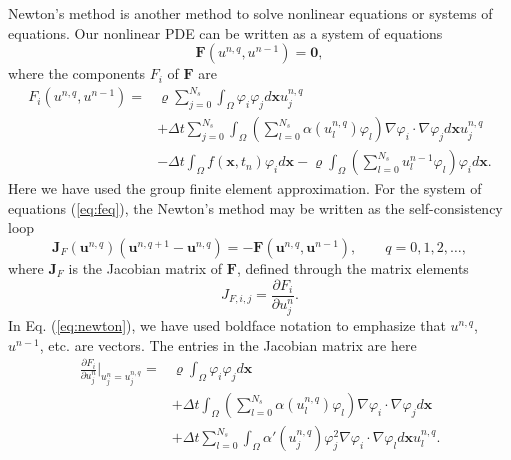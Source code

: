 \documentclass[twoside]{article}
\begin{document}
Newton's method is another method to solve nonlinear equations or systems of equations. Our nonlinear PDE can be written as a system of equations
\begin{equation} \label{eq:feq}
  \mathbf{F}(u^{n, q}, u^{n-1}) = \mathbf{0},
\end{equation}
where the components $F_{i}$ of $\mathbf{F}$ are
\begin{align}
  F_{i}(u^{n, q}, u^{n-1}) =& \varrho \sum_{j=0}^{N_{s}} \int_{\Omega }\varphi_{i}\varphi_{j}d\mathbf{x}u_{j}^{n, q} \nonumber \\
  & + \Delta t \sum_{j=0}^{N_{s}}\int_{\Omega }\left( \sum_{l=0}^{N_{s}} \alpha(u_{l}^{n, q})\varphi_{l}\right) \nabla \varphi_{i}\cdot \nabla \varphi_{j}d\mathbf{x}u_{j}^{n, q} \nonumber \\
  & - \Delta t \int_{\Omega }f(\mathbf{x}, t_{n})\varphi_{i}d\mathbf{x} - \varrho \int_{\Omega } \left( \sum_{l=0}^{N_{s}}u_{l}^{n-1}\varphi_{l}\right)\varphi_{i}d\mathbf{x}.
\end{align}
Here we have used the group finite element approximation.  For the system of equations (\ref{eq:feq}), the Newton's method may be written as the self-consistency loop
\begin{equation} \label{eq:newton}
  \mathbf{J}_{F}(\mathbf{u}^{n, q})(\mathbf{u}^{n, q+1} - \mathbf{u}^{n, q}) = -\mathbf{F}(\mathbf{u}^{n, q}, \mathbf{u}^{n-1}), \qquad q = 0, 1, 2, \dots , 
\end{equation}   
where $\mathbf{J}_{F}$ is the Jacobian matrix of $\mathbf{F}$, defined through the matrix elements
\begin{equation}
  J_{F, i, j} = \frac{\partial F_{i}}{\partial u_{j}^{n}}.
\end{equation}
In Eq. (\ref{eq:newton}), we have used boldface notation to emphasize that $u^{n, q}$, $u^{n-1}$, etc. are vectors. The entries in the Jacobian matrix are here
\begin{align}
  \frac{\partial F_{i}}{\partial u_{j}^{n}}\Bigg\vert_{u_{j}^{n}=u_{j}^{n, q}} =& \varrho \int_{\Omega }\varphi_{i}\varphi_{j}d\mathbf{x} \nonumber \\
  & + \Delta t \int_{\Omega }\left( \sum_{l=0}^{N_{s}}\alpha(u_{l}^{n, q})\varphi_{l}\right)\nabla \varphi_{i}\cdot \nabla \varphi_{j}d\mathbf{x} \nonumber \\
  & + \Delta t \sum_{l=0}^{N_{s}}\int_{\Omega }\alpha'(u_{j}^{n, q})\varphi_{j}^{2}\nabla \varphi_{i}\cdot \nabla \varphi_{l}d\mathbf{x}u_{l}^{n, q}.
\end{align}
\end{document}
